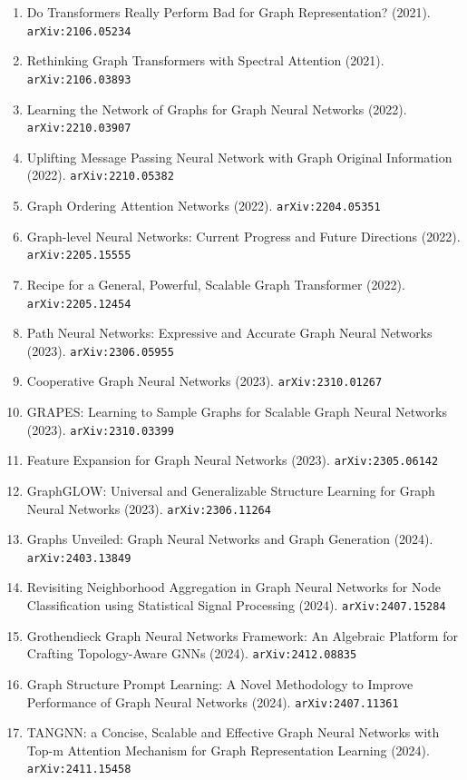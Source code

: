 \documentclass[11pt]{article}
\begin{document}
\begin{enumerate}
  \item Do Transformers Really Perform Bad for Graph Representation? (2021). \texttt{arXiv:2106.05234}
  \item Rethinking Graph Transformers with Spectral Attention (2021). \texttt{arXiv:2106.03893}
  \item Learning the Network of Graphs for Graph Neural Networks (2022). \texttt{arXiv:2210.03907}
  \item Uplifting Message Passing Neural Network with Graph Original Information (2022). \texttt{arXiv:2210.05382}
  \item Graph Ordering Attention Networks (2022). \texttt{arXiv:2204.05351}
  \item Graph-level Neural Networks: Current Progress and Future Directions (2022). \texttt{arXiv:2205.15555}
  \item Recipe for a General, Powerful, Scalable Graph Transformer (2022). \texttt{arXiv:2205.12454}
  \item Path Neural Networks: Expressive and Accurate Graph Neural Networks (2023). \texttt{arXiv:2306.05955}
  \item Cooperative Graph Neural Networks (2023). \texttt{arXiv:2310.01267}
  \item GRAPES: Learning to Sample Graphs for Scalable Graph Neural Networks (2023). \texttt{arXiv:2310.03399}
  \item Feature Expansion for Graph Neural Networks (2023). \texttt{arXiv:2305.06142}
  \item GraphGLOW: Universal and Generalizable Structure Learning for Graph
  Neural Networks (2023). \texttt{arXiv:2306.11264}
  \item Graphs Unveiled: Graph Neural Networks and Graph Generation (2024). \texttt{arXiv:2403.13849}
  \item Revisiting Neighborhood Aggregation in Graph Neural Networks for Node
  Classification using Statistical Signal Processing (2024). \texttt{arXiv:2407.15284}
  \item Grothendieck Graph Neural Networks Framework: An Algebraic Platform for Crafting Topology-Aware GNNs (2024). \texttt{arXiv:2412.08835}
  \item Graph Structure Prompt Learning: A Novel Methodology to Improve
  Performance of Graph Neural Networks (2024). \texttt{arXiv:2407.11361}
  \item TANGNN: a Concise, Scalable and Effective Graph Neural Networks with
  Top-m Attention Mechanism for Graph Representation Learning (2024). \texttt{arXiv:2411.15458}

\end{enumerate}
\end{document}
